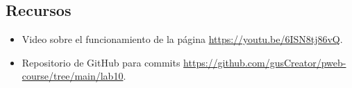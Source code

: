 \documentclass{article}
\begin{document}
  \subsection{Recursos}

  \begin{itemize}
    \item Video sobre el funcionamiento de la página \url{https://youtu.be/6ISN8tj86vQ}.
    \item Repositorio de GitHub para commits \url{https://github.com/gusCreator/pweb-course/tree/main/lab10}.
  \end{itemize}

\clearpage
	
%
%
%
			
\end{document}
